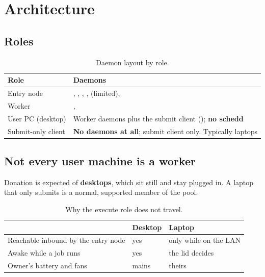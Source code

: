 \chapter{Architecture}
\label{ch:arch}

\section{Roles}

\begin{table}[H]
\centering
\begin{tabularx}{\textwidth}{L{0.24\textwidth} Y}
\toprule
\textbf{Role} & \textbf{Daemons} \\
\midrule
Entry node & , , , ,  (limited),  \\
Worker & ,  \\
User PC (desktop) & Worker daemons plus the submit client (); \textbf{no schedd} \\
Submit-only client & \textbf{No daemons at all}; submit client only. Typically laptops \\
\bottomrule
\end{tabularx}
\caption{Daemon layout by role.}
\end{table}

\section{Not every user machine is a worker}
\label{sec:notallworkers}

Donation is expected of \textbf{desktops}, which sit still and stay plugged in.
A laptop that only submits is a normal, supported member of the pool.

\begin{table}[H]
\centering
\begin{tabularx}{\textwidth}{Y L{0.18\textwidth} L{0.24\textwidth}}
\toprule
& \textbf{Desktop} & \textbf{Laptop} \\
\midrule
Reachable inbound by the entry node & yes & only while on the LAN \\
Awake while a job runs & yes & the lid decides \\
Owner's battery and fans & mains & theirs \\
\bottomrule
\end{tabularx}
\caption{Why the execute role does not travel.}
\end{table}

